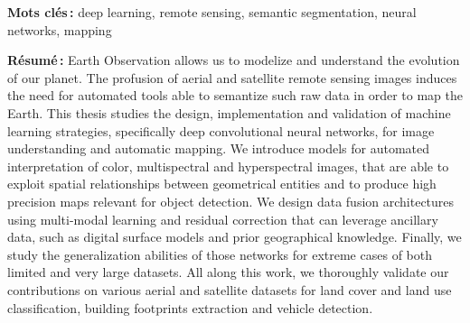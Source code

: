 {\begin{titlepage}
\begin{minipage}{\textwidth}
\bigskip

\textbf{Mots clés\,:} deep learning, remote sensing, semantic segmentation, neural networks, mapping
\begin{multicols}{2}
\textbf{Résumé\,:}
Earth Observation allows us to modelize and understand the evolution of our planet. The profusion of aerial and satellite remote sensing images induces the need for automated tools able to semantize such raw data in order to map the Earth. This thesis studies the design, implementation and validation of machine learning strategies, specifically deep convolutional neural networks, for image understanding and automatic mapping. We introduce models for automated interpretation of color, multispectral and hyperspectral images, that are able to exploit spatial relationships between geometrical entities and to produce high precision maps relevant for object detection. We design data fusion architectures using multi-modal learning and residual correction that can leverage ancillary data, such as digital surface models and prior geographical knowledge. Finally, we study the generalization abilities of those networks for extreme cases of both limited and very large datasets. All along this work, we thoroughly validate our contributions on various aerial and satellite datasets for land cover and land use classification, building footprints extraction and vehicle detection.
\end{multicols}
\end{minipage}
\end{titlepage}

\restoregeometry
}
\makeatother
